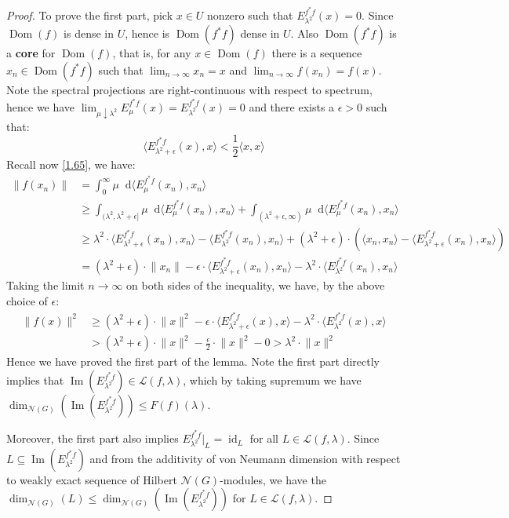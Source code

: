 \documentclass[11pt]{report}
\theoremstyle{definition}
\theoremstyle{plain}
\DeclareMathOperator{\id}{id}
\DeclareMathOperator{\im}{Im}
\DeclareMathOperator{\dom}{Dom}
\newcommand{\vna}{\mathcal{N}}
\newcommand{\brac}[1]{\langle #1 \rangle}
\newcommand{\norm}[1]{\lVert #1 \rVert}
\newcommand{\mass}[1]{\mathop{}\mathrm{d}{#1}}
\begin{document}
\begin{proof}
To prove the first part, pick $x\in U$ nonzero such that $E^{f^*f}_{\lambda^2}(x)=0$. Since $\dom(f)$ is dense in $U$, hence is $\dom(f^*f)$ dense in $U$. Also $\dom(f^*f)$ is a \textbf{core} for $\dom(f)$, that is, for any $x\in \dom(f)$ there is a sequence $x_n\in \dom(f^*f)$ such that $\lim_{n\to \infty}x_n=x$ and $\lim_{n\to \infty}f(x_n)=f(x)$. Note the spectral projections are right-continuous with respect to spectrum, hence we have $\lim_{\mu\downarrow\lambda^2}E_{\mu}^{f^*f}(x)=E^{f^*f}_{\lambda^2}(x)=0$ and there exists a $\epsilon>0$ such that:
\begin{equation*}
\brac{E_{\lambda^2+\epsilon}^{f^*f}(x), x}<\frac{1}{2}\brac{x,x}
\end{equation*}
Recall now \ref{1.65}, we have:
\begin{align*}
\norm{f(x_n)}&=\int_0^\infty\mu \mass{\brac{E^{f^*f}_\mu(x_n), x_n}}\\
&\geq \int_{(\lambda^2, \lambda^2+\epsilon]}\mu \mass{\brac{E^{f^*f}_\mu(x_n), x_n}}+\int_{(\lambda^2+\epsilon, \infty)}\mu \mass{\brac{E^{f^*f}_\mu(x_n), x_n}}\\
&\geq \lambda^2\cdot \brac{E^{f^*f}_{\lambda^2+\epsilon}(x_n), x_n}-\brac{E^{f^*f}_{\lambda^2}(x_n), x_n}+(\lambda^2+\epsilon)\cdot(\brac{x_n, x_n}-\brac{E^{f^*f}_{\lambda^2+\epsilon}(x_n), x_n})\\
&=(\lambda^2+\epsilon)\cdot\norm{x_n}-\epsilon\cdot\brac{E^{f^*f}_{\lambda^2+\epsilon}(x_n), x_n}-\lambda^2\cdot \brac{E^{f^*f}_{\lambda^2}(x_n), x_n}
\end{align*}
Taking the limit $n\to \infty$ on both sides of the inequality, we have, by the above choice of $\epsilon$:
\begin{align*}
\norm{f(x)}^2&\geq (\lambda^2+\epsilon)\cdot \norm{x}^2-\epsilon\cdot\brac{E^{f^*f}_{\lambda^2+\epsilon}(x), x}-\lambda^2\cdot \brac{E^{f^*f}_{\lambda^2}(x), x}\\
&> (\lambda^2+\epsilon)\cdot \norm{x}^2-\frac{\epsilon}{2}\cdot \norm{x}^2-0>\lambda^2\cdot\norm{x}^2
\end{align*}
Hence we have proved the first part of the lemma. Note the first part directly implies that $\im(E^{f^*f}_{\lambda^2})\in \mathcal{L}(f,\lambda)$, which by taking supremum we have $\dim_{\vna(G)}(\im (E_{\lambda^2}^{f^*f}))\leq F(f)(\lambda)$. 
\par Moreover, the first part also implies $E^{f^*f}_{\lambda^2}|_L=\id_L$ for all $L\in \mathcal{L}(f, \lambda)$. Since $L\subseteq \im(E^{f^*f}_{\lambda^2})$ and from the additivity of von Neumann dimension with respect to weakly exact sequence of Hilbert $\vna(G)$-modules, we have the $\dim_{\vna(G)}(L)\leq \dim_{\vna(G)}(\im (E_{\lambda^2}^{f^*f}))$ for $L\in \mathcal{L}(f, \lambda)$.
\end{proof}
\end{document}
